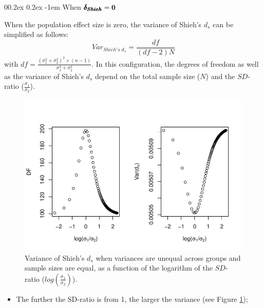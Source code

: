 \documentclass[
  english,
  man]{apa6}
\makeatletter
\providecommand{\tightlist}{%
  \setlength{\itemsep}{0pt}\setlength{\parskip}{0pt}}
\let\oldparagraph\paragraph
\renewcommand{\paragraph}[1]{\oldparagraph{#1}\mbox{}}
\renewcommand{\paragraph}{\@startsection{paragraph}{4}{\parindent}%
  {0\baselineskip \@plus 0.2ex \@minus 0.2ex}%
  {-1em}%
  {\normalfont\normalsize\bfseries\itshape\typesectitle}}
\makeatother
\begin{document}
\hypertarget{when-bf-pmbdelta_shieh0-1}{%
\paragraph{\texorpdfstring{When \(\bf \pmb{\delta_{Shieh}}=0\)}{When \textbackslash bf \textbackslash pmb\{\textbackslash delta\_\{Shieh\}\}=0}}\label{when-bf-pmbdelta_shieh0-1}}

When the population effect size is zero, the variance of Shieh's \(d_s\) can be simplified as follows:
\[Var_{Shieh's \; d_s} = \frac{df}{(df-2)N}\]
with \(df = \frac{(\sigma_1^2+\sigma_2^2)^2 \times (n-1)}{\sigma_1^4+\sigma_2^4}\). In this configuration, the degrees of freedom as well as the variance of Shieh's \(d_s\) depend on the total sample size (\(N\)) and the \(SD\)-ratio (\(\frac{\sigma_1}{\sigma_2}\)).

\begin{figure}
\centering
\includegraphics{Theoretical-Variance-of-all-estimators-as-a-function-of-population-parameters_files/figure-latex/varshiehhetbalSDratio2-1.pdf}
\caption{\label{fig:varshiehhetbalSDratio2}Variance of Shieh's \(d_s\) when variances are unequal across groups and sample sizes are equal, as a function of the logarithm of the \(SD\)-ratio (\(log \left( \frac{\sigma_1}{\sigma_2} \right)\)).}
\end{figure}

\begin{itemize}
\tightlist
\item
  The further the SD-ratio is from 1, the larger the variance (see Figure \ref{fig:varshiehhetbalSDratio2});
\end{itemize}
\end{document}
